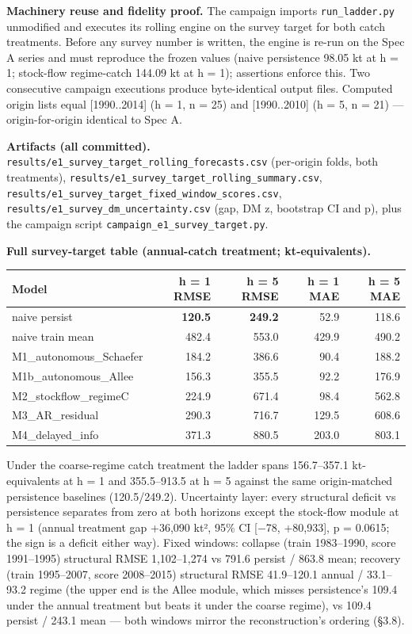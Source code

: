 \documentclass[11pt]{article}
\begin{document}
\textbf{Machinery reuse and fidelity proof.} The campaign imports
\texttt{run\_ladder.py} unmodified and executes its rolling engine on
the survey target for both catch treatments. Before any survey number is
written, the engine is re-run on the Spec A series and must reproduce
the frozen values (naive persistence 98.05 kt at h = 1; stock-flow
regime-catch 144.09 kt at h = 1); assertions enforce this. Two
consecutive campaign executions produce byte-identical output files.
Computed origin lists equal {[}1990..2014{]} (h = 1, n = 25) and
{[}1990..2010{]} (h = 5, n = 21) --- origin-for-origin identical to Spec
A.

\textbf{Artifacts (all committed).}
\texttt{results/e1\_survey\_target\_rolling\_forecasts.csv} (per-origin
folds, both treatments),
\texttt{results/e1\_survey\_target\_rolling\_summary.csv},
\texttt{results/e1\_survey\_target\_fixed\_window\_scores.csv},
\texttt{results/e1\_survey\_dm\_uncertainty.csv} (gap, DM z, bootstrap
CI and p), plus the campaign script
\texttt{campaign\_e1\_survey\_target.py}.

\textbf{Full survey-target table (annual-catch treatment;
kt-equivalents).}

{\def\LTcaptype{none} %
\begin{longtable}[]{@{}lrrrr@{}}
\toprule\noalign{}
Model & h = 1 RMSE & h = 5 RMSE & h = 1 MAE & h = 5 MAE \\
\midrule\noalign{}
\endhead
\bottomrule\noalign{}
\endlastfoot
naive persist & \textbf{120.5} & \textbf{249.2} & 52.9 & 118.6 \\
naive train mean & 482.4 & 553.0 & 429.9 & 490.2 \\
M1\_autonomous\_Schaefer & 184.2 & 386.6 & 90.4 & 188.2 \\
M1b\_autonomous\_Allee & 156.3 & 355.5 & 92.2 & 176.9 \\
M2\_stockflow\_regimeC & 224.9 & 671.4 & 98.4 & 562.8 \\
M3\_AR\_residual & 290.3 & 716.7 & 129.5 & 608.6 \\
M4\_delayed\_info & 371.3 & 880.5 & 203.0 & 803.1 \\
\end{longtable}
}

Under the coarse-regime catch treatment the ladder spans 156.7--357.1
kt-equivalents at h = 1 and 355.5--913.5 at h = 5 against the same
origin-matched persistence baselines (120.5/249.2). Uncertainty layer:
every structural deficit vs persistence separates from zero at both
horizons except the stock-flow module at h = 1 (annual treatment gap
+36,090 kt², 95\% CI {[}−78, +80,933{]}, p = 0.0615; the sign is a
deficit either way). Fixed windows: collapse (train 1983--1990, score
1991--1995) structural RMSE 1,102--1,274 vs 791.6 persist / 863.8 mean;
recovery (train 1995--2007, score 2008--2015) structural RMSE
41.9--120.1 annual / 33.1--93.2 regime (the upper end is the Allee
module, which misses persistence's 109.4 under the annual treatment but
beats it under the coarse regime), vs 109.4 persist / 243.1 mean ---
both windows mirror the reconstruction's ordering (§3.8).
\end{document}

